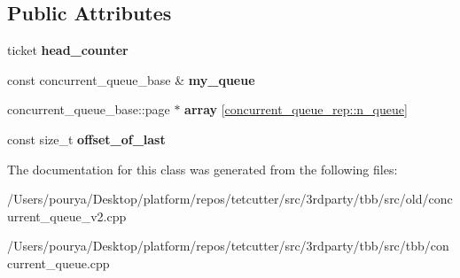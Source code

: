 \subsection*{Public Attributes}
\begin{DoxyCompactItemize}
\item 
\hypertarget{classtbb_1_1internal_1_1concurrent__queue__iterator__rep_af10524671f5ac729e6d91a9e3af422dd}{}ticket {\bfseries head\+\_\+counter}\label{classtbb_1_1internal_1_1concurrent__queue__iterator__rep_af10524671f5ac729e6d91a9e3af422dd}

\item 
\hypertarget{classtbb_1_1internal_1_1concurrent__queue__iterator__rep_a630633c87aa688da7a445251f09c45de}{}const concurrent\+\_\+queue\+\_\+base \& {\bfseries my\+\_\+queue}\label{classtbb_1_1internal_1_1concurrent__queue__iterator__rep_a630633c87aa688da7a445251f09c45de}

\item 
\hypertarget{classtbb_1_1internal_1_1concurrent__queue__iterator__rep_a311180d0bca561628e60bec3aa1f8923}{}concurrent\+\_\+queue\+\_\+base\+::page $\ast$ {\bfseries array} \mbox{[}\hyperlink{classtbb_1_1internal_1_1concurrent__queue__rep_a125288547cb8f625dd3eab221afb805c}{concurrent\+\_\+queue\+\_\+rep\+::n\+\_\+queue}\mbox{]}\label{classtbb_1_1internal_1_1concurrent__queue__iterator__rep_a311180d0bca561628e60bec3aa1f8923}

\item 
\hypertarget{classtbb_1_1internal_1_1concurrent__queue__iterator__rep_a41c25e15d1240d778b262a42972dae0e}{}const size\+\_\+t {\bfseries offset\+\_\+of\+\_\+last}\label{classtbb_1_1internal_1_1concurrent__queue__iterator__rep_a41c25e15d1240d778b262a42972dae0e}

\end{DoxyCompactItemize}


The documentation for this class was generated from the following files\+:\begin{DoxyCompactItemize}
\item 
/\+Users/pourya/\+Desktop/platform/repos/tetcutter/src/3rdparty/tbb/src/old/concurrent\+\_\+queue\+\_\+v2.\+cpp\item 
/\+Users/pourya/\+Desktop/platform/repos/tetcutter/src/3rdparty/tbb/src/tbb/concurrent\+\_\+queue.\+cpp\end{DoxyCompactItemize}

